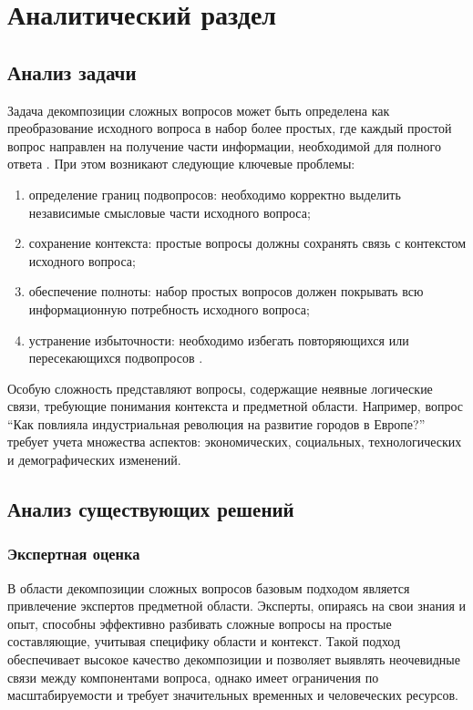 \chapter{Аналитический раздел}

\section{Анализ задачи}

Задача декомпозиции сложных вопросов может быть определена как преобразование исходного вопроса в набор более простых, где каждый простой вопрос направлен на получение части информации, необходимой для полного ответа \cite{perez2020unsupervised}. При этом возникают следующие ключевые проблемы:

\begin{enumerate}
	\item определение границ подвопросов: необходимо корректно выделить независимые смысловые части исходного вопроса;
	\item сохранение контекста: простые вопросы должны сохранять связь с контекстом исходного вопроса;
	\item обеспечение полноты: набор простых вопросов должен покрывать всю информационную потребность исходного вопроса;
	\item устранение избыточности: необходимо избегать повторяющихся или пересекающихся подвопросов \cite{barhaim2020quantitative}.
\end{enumerate}

Особую сложность представляют вопросы, содержащие неявные логические связи, требующие понимания контекста и предметной области. Например, вопрос \enquote{Как повлияла индустриальная революция на развитие городов в Европе?} требует учета множества аспектов: экономических, социальных, технологических и демографических изменений.

\section{Анализ существующих решений}

\subsection{Экспертная оценка}

В области декомпозиции сложных вопросов базовым подходом является привлечение экспертов предметной области. Эксперты, опираясь на свои знания и опыт, способны эффективно разбивать сложные вопросы на простые составляющие, учитывая специфику области и контекст. Такой подход обеспечивает высокое качество декомпозиции и позволяет выявлять неочевидные связи между компонентами вопроса, однако имеет ограничения по масштабируемости и требует значительных временных и человеческих ресурсов. \cite{wang2022human}

